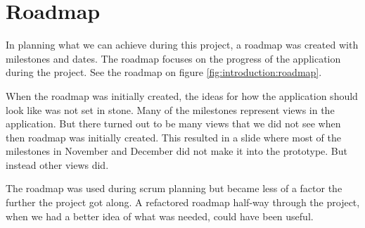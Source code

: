 \section{Roadmap}
In planning what we can achieve during this project, a roadmap was created with milestones and dates. 
The roadmap focuses on the progress of the application during the project. 
See the roadmap on figure \ref{fig:introduction:roadmap}.

When the roadmap was initially created, the ideas for how the application should look like was not set in stone.
Many of the milestones represent views in the application.
But there turned out to be many views that we did not see when then roadmap was initially created.
This resulted in a slide where most of the milestones in  November and December did not make it into the prototype.
But instead other views did.

The roadmap was used during \gls{scrum} planning but became less of a factor the further the project got along. A refactored roadmap half-way through the project, when we had a better idea of what was needed, could have been useful.

